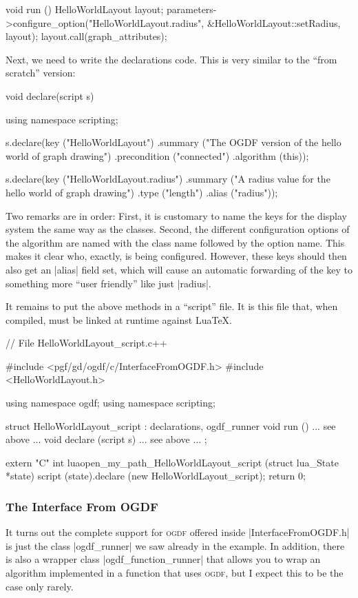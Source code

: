 \begin{codeexample}
void run ()
{
  HelloWorldLayout layout;
  parameters->configure_option("HelloWorldLayout.radius", &HelloWorldLayout::setRadius, layout);
  layout.call(graph_attributes);
}
\end{codeexample}

Next, we need to write the declarations code. This is very similar to the
``from scratch'' version:

\begin{codeexample}
void declare(script s) {
  using namespace scripting;

  s.declare(key ("HelloWorldLayout")
            .summary ("The OGDF version of the hello world of graph drawing")
            .precondition ("connected")
            .algorithm (this));
    
  s.declare(key ("HelloWorldLayout.radius")
            .summary ("A radius value for the hello world of graph drawing")
            .type ("length")
            .alias ("radius"));
}
\end{codeexample}

Two remarks are in order: First, it is customary to name the keys for
the display system the same way as the classes. Second, the different
configuration options of the algorithm are named with the class name
followed by the option name. This makes it clear who, exactly, is
being configured. However, these keys should then also get an |alias|
field set, which will cause an automatic forwarding of the key to
something more ``user friendly'' like just |radius|. 

It remains to put the above methods in a ``script'' file. It is this
file that, when compiled, must be linked at runtime against Lua\TeX.

\begin{codeexample}
// File HelloWorldLayout_script.c++

#include <pgf/gd/ogdf/c/InterfaceFromOGDF.h>
#include <HelloWorldLayout.h>

using namespace ogdf;
using namespace scripting;

struct HelloWorldLayout_script : declarations, ogdf_runner {
  void run ()             { ... see above ... }
  void declare (script s) { ... see above ... }
};

extern "C" int luaopen_my_path_HelloWorldLayout_script (struct lua_State *state) {
  script (state).declare (new HelloWorldLayout_script);
  return 0;
}
\end{codeexample}


\subsubsection{The Interface From OGDF}

It turns out the complete support for \textsc{ogdf} offered inside
|InterfaceFromOGDF.h| is just the class |ogdf_runner| we saw already
in the example. In addition, there is also a wrapper class
|ogdf_function_runner| that allows you to wrap an algorithm
implemented in a function that uses \textsc{ogdf}, but I expect this
to be the case only rarely.
